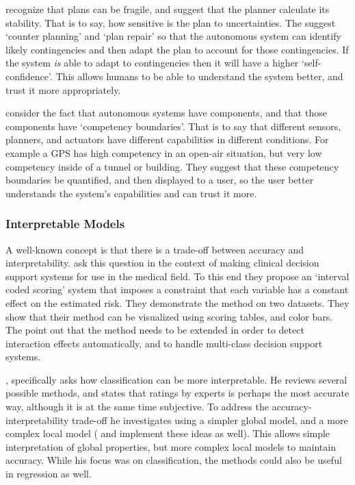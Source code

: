     \citet{Kuter2015-qh} recognize that plans can be fragile, and suggest that the planner calculate its stability. That is to say, how sensitive is the plan to uncertainties. The suggest `counter planning' and `plan repair' so that the autonomous system can identify likely contingencies and then adapt the plan to account for those contingencies. If the system \emph{is} able to adapt to contingencies then it will have a higher `self-confidence'. This allows humans to be able to understand the system better, and trust it more appropriately.

    \citet{Hutchins2015-if} consider the fact that autonomous systems have components, and that those components have `competency boundaries'. That is to say that different sensors, planners, and actuators have different capabilities in different conditions. For example a GPS has high competency in an open-air situation, but very low competency inside of a tunnel or building. They suggest that these competency boundaries be quantified, and then displayed to a user, so the user better understands the system's capabilities and can trust it more.

\subsubsection{Interpretable Models}
    A well-known concept is that there is a trade-off between accuracy and interpretability. \citet{Van_Belle2012-dt} ask this question in the context of making clinical decision support systems for use in the medical field. To this end they propose an `interval coded scoring' system that imposes a constraint that each variable has a constant effect on the estimated risk. They demonstrate the method on two datasets. They show that their method can be visualized using scoring tables, and color bars. The point out that the method needs to be extended in order to detect interaction effects automatically, and to handle multi-class decision support systems.

    \citet{Ruping2006-xj}, specifically asks how classification can be more interpretable. He reviews several possible methods, and states that ratings by experts is perhaps the most accurate way, although it is at the same time subjective. To address the accuracy-interpretability trade-off he investigates using a simpler global model, and a more complex local model (\citet{Otte2013-oo} and \citet{Ribeiro2016-uc} implement these ideas as well). This allows simple interpretation of global properties, but more complex local models to maintain accuracy. While his focus was on classification, the methods could also be useful in regression as well.

